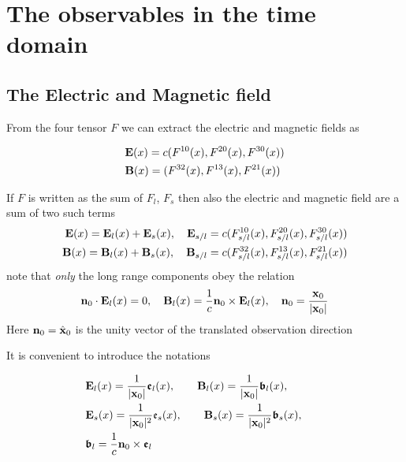 \section{The observables in the time domain}


\subsection{The Electric and Magnetic field}

From the four tensor $F$ we can extract the electric and magnetic fields as
\begin{importantbox}
\begin{align}
     & {\bf E}(x)  = c(F^{10}(x), F^{20}(x), F^{30}(x)) \\
     & {\bf B}(x)  = (F^{32}(x), F^{13}(x), F^{21}(x))  
\end{align}\end{importantbox}
If $F$ is written as the sum of $F_l$, $F_s$ then also the electric and magnetic field are a sum of two such terms
\begin{align}
    {\bf E}(x)={\bf E}_l(x)+{\bf E}_s(x), \quad {\bf E}_{s/l} =c(F^{10}_{s/l}(x), F^{20}_{s/l}(x), F^{30}_{s/l}(x)) \\
    {\bf B}(x)={\bf B}_l(x)+{\bf B}_s(x), \quad {\bf B}_{s/l} =c(F^{32}_{s/l}(x), F^{13}_{s/l}(x), F^{21}_{s/l}(x))
\end{align}
note that {\it only} the long range components obey the relation
\begin{align}
    {\bf n}_0\cdot{\bf E}_l(x) =0,\quad {\bf B}_l(x) = \frac1c{\bf n}_0\times{\bf E}_l(x), \quad {\bf n}_0=\frac{{\bf x}_0}{|{\bf x}_0|}
\end{align}
Here ${\bf n}_0=\hat{\bf x}_0$ is the unity vector of the translated  observation direction

It is convenient to introduce the notations
\begin{importantbox}
\begin{align}
     & {\bf E}_l(x) = \frac1{|{\bf x}_0|}{\boldsymbol{\mathfrak e}}_l(x),\qquad{\bf B}_l(x) = \frac1{|{\bf x}_0|}{\boldsymbol{\mathfrak b}}_l(x),\qquad\nonumber \\
     & {\bf E}_s(x) = \frac1{|{\bf x}_0|^2}{\mathfrak e}_s(x),\qquad{\bf B}_s(x) = \frac1{|{\bf x}_0|^2}{\boldsymbol{\mathfrak b}}_s(x),\qquad\nonumber          \\
     & {\boldsymbol{\mathfrak b}}_l = \frac1{c}{\bf n}_0\times{\boldsymbol{\mathfrak e}}_l
\end{align}
\end{importantbox}



